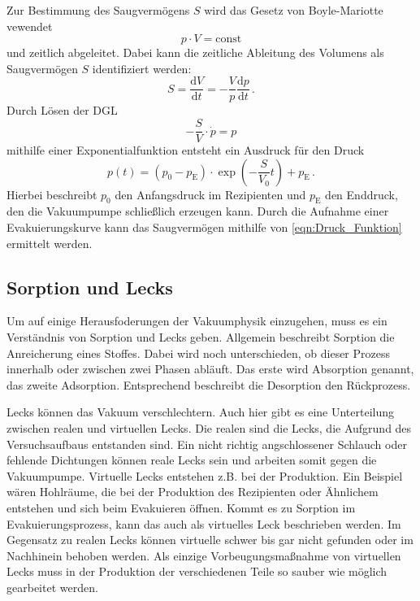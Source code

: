         \noindent
        Zur Bestimmung des Saugvermögens $S$ wird das Gesetz von Boyle-Mariotte vewendet
        \begin{equation*}
            p \cdot V = \text{const}
        \end{equation*}
        und zeitlich abgeleitet.
        Dabei kann die zeitliche Ableitung des Volumens als Saugvermögen $S$ identifiziert werden:
        \begin{equation*}
            S = \frac{\text{d}V}{\text{d}t} = - \frac{V}{p} \frac{\text{d}p}{\text{d}t} \, .
        \end{equation*}
        Durch Lösen der DGL
        \begin{equation}
            - \frac{S}{V} \cdot \dot{p} = p
            \label{eqn:saug_eva_theo}
        \end{equation}
        mithilfe einer Exponentialfunktion entsteht ein Ausdruck für den Druck
        \begin{equation}
            p(t) = (p_0 - p_\text{E}) \cdot \exp{(- \frac{S}{V_0}t)} +p_\text{E} \, .
            \label{eqn:Druck_Funktion}
        \end{equation}
        Hierbei beschreibt $p_0$ den Anfangsdruck im Rezipienten und $p_\text{E}$ den Enddruck, den die Vakuumpumpe schließlich erzeugen kann.
        Durch die Aufnahme einer Evakuierungskurve kann das Saugvermögen mithilfe von \eqref{eqn:Druck_Funktion} ermittelt werden.

    \subsection{Sorption und Lecks}
        Um auf einige Herausfoderungen der Vakuumphysik einzugehen, muss es ein Verständnis von Sorption und Lecks geben.
        Allgemein beschreibt Sorption die Anreicherung eines Stoffes.
        Dabei wird noch unterschieden, ob dieser Prozess innerhalb oder zwischen zwei Phasen abläuft.
        Das erste wird Absorption genannt, das zweite Adsorption.
        Entsprechend beschreibt die Desorption den Rückprozess.

        \noindent
        Lecks können das Vakuum verschlechtern.
        Auch hier gibt es eine Unterteilung zwischen realen und virtuellen Lecks.
        Die realen sind die Lecks, die Aufgrund des Versuchsaufbaus entstanden sind.
        Ein nicht richtig angschlossener Schlauch oder fehlende Dichtungen können reale Lecks sein und arbeiten somit gegen die Vakuumpumpe.
        Virtuelle Lecks entstehen z.B. bei der Produktion.
        Ein Beispiel wären Hohlräume, die bei der Produktion des Rezipienten oder Ähnlichem entstehen und sich beim Evakuieren öffnen.
        Kommt es zu Sorption im Evakuierungsprozess, kann das auch als virtuelles Leck beschrieben werden.
        Im Gegensatz zu realen Lecks können virtuelle schwer bis gar nicht gefunden oder im Nachhinein behoben werden.
        Als einzige Vorbeugungsmaßnahme von virtuellen Lecks muss in der Produktion der verschiedenen Teile so sauber wie möglich gearbeitet werden.
        
